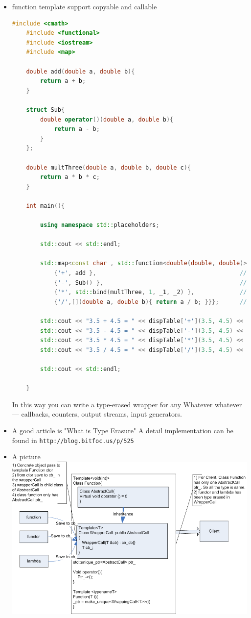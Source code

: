 \documentclass[a4paper,12pt,twoside]{book}
\begin{document}
\begin{itemize}
	\item function template support copyable and callable 
	\begin{lstlisting}[frame=single, language=c++]
	#include <cmath>
	#include <functional>
	#include <iostream>
	#include <map>
	
	double add(double a, double b){
		return a + b;
	}
	
	struct Sub{
		double operator()(double a, double b){
			return a - b;
		}
	};
	
	double multThree(double a, double b, double c){
		return a * b * c;
	}
	
	int main(){
		
		using namespace std::placeholders;
		
		std::cout << std::endl;
		
		std::map<const char , std::function<double(double, double)>> dispTable{  // (1)
			{'+', add },                                         // (2)
			{'-', Sub() },                                       // (3)
			{'*', std::bind(multThree, 1, _1, _2) },             // (4)
			{'/',[](double a, double b){ return a / b; }}};      // (5)
		
		std::cout << "3.5 + 4.5 = " << dispTable['+'](3.5, 4.5) << std::endl;
		std::cout << "3.5 - 4.5 = " << dispTable['-'](3.5, 4.5) << std::endl;
		std::cout << "3.5 * 4.5 = " << dispTable['*'](3.5, 4.5) << std::endl;
		std::cout << "3.5 / 4.5 = " << dispTable['/'](3.5, 4.5) << std::endl;
		
		std::cout << std::endl;
		
	}
	\end{lstlisting}
	
	
	
	In this way you can write a type-erased wrapper for any Whatever whatever — callbacks, counters, output streams, input generators.
	
	\item A good article is "What is Type Erasure" A detail implementation can be found in \verb|http://blog.bitfoc.us/p/525|
	\item A picture 
	\includegraphics[scale=0.6]{pics/function1.png}
	

\end{itemize}
\end{document}
